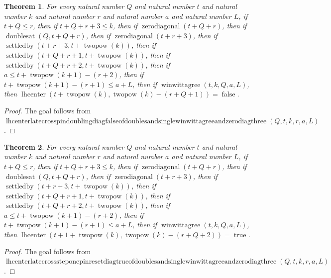 \documentclass[11pt]{article}
\newtheorem{theorem}{Theorem}[section]
\theoremstyle{definition}
\begin{document}
\begin{theorem}
\label{ll:paper:lhcenter-late-cross-pin-doubling-diag-false-of-doubles-and-single-winwittagree-and-zero-diag-three}
For every natural number \(Q\) and natural number \(t\) and natural number \(k\) and natural number \(r\) and natural number \(a\) and natural number \(L\), if \(t + Q \le r\), then if \(t + Q + r + 3 \le k\), then if \(\operatorname{zerodiagonal}(t + Q + r)\), then if \(\operatorname{doublesat}(Q, t + Q + r)\), then if \(\operatorname{zerodiagonal}(t + r + 3)\), then if \(\operatorname{settledby}(t + r + 3, t + \operatorname{twopow}(k))\), then if \(\operatorname{settledby}(t + Q + r + 1, t + \operatorname{twopow}(k))\), then if \(\operatorname{settledby}(t + Q + r + 2, t + \operatorname{twopow}(k))\), then if \(a \le t + \operatorname{twopow}(k + 1) - (r + 2)\), then if \(t + \operatorname{twopow}(k + 1) - (r + 1) \le a + L\), then if \(\operatorname{winwittagree}(t, k, Q, a, L)\), then \(\operatorname{lhcenter}(t + \operatorname{twopow}(k), \operatorname{twopow}(k) - (r + Q + 1)) = \operatorname{false}\).
\end{theorem}
\begin{proof}
The goal follows from \(\operatorname{lhcenterlatecrosspindoublingdiagfalseofdoublesandsinglewinwittagreeandzerodiagthree}(Q, t, k, r, a, L)\).
\end{proof}
\begin{theorem}
\label{ll:paper:lhcenter-late-cross-step-one-pin-reset-diag-true-of-doubles-and-single-winwittagree-and-zero-diag-three}
For every natural number \(Q\) and natural number \(t\) and natural number \(k\) and natural number \(r\) and natural number \(a\) and natural number \(L\), if \(t + Q \le r\), then if \(t + Q + r + 3 \le k\), then if \(\operatorname{zerodiagonal}(t + Q + r)\), then if \(\operatorname{doublesat}(Q, t + Q + r)\), then if \(\operatorname{zerodiagonal}(t + r + 3)\), then if \(\operatorname{settledby}(t + r + 3, t + \operatorname{twopow}(k))\), then if \(\operatorname{settledby}(t + Q + r + 1, t + \operatorname{twopow}(k))\), then if \(\operatorname{settledby}(t + Q + r + 2, t + \operatorname{twopow}(k))\), then if \(a \le t + \operatorname{twopow}(k + 1) - (r + 2)\), then if \(t + \operatorname{twopow}(k + 1) - (r + 1) \le a + L\), then if \(\operatorname{winwittagree}(t, k, Q, a, L)\), then \(\operatorname{lhcenter}(t + 1 + \operatorname{twopow}(k), \operatorname{twopow}(k) - (r + Q + 2)) = \operatorname{true}\).
\end{theorem}
\begin{proof}
The goal follows from \(\operatorname{lhcenterlatecrosssteponepinresetdiagtrueofdoublesandsinglewinwittagreeandzerodiagthree}(Q, t, k, r, a, L)\).
\end{proof}
\end{document}
